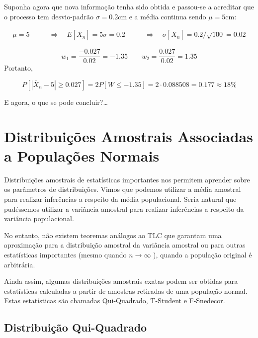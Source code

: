 \documentclass[
]{book}
\theoremstyle{definition}
\theoremstyle{definition}
\theoremstyle{definition}
\theoremstyle{remark}
\begin{document}
Suponha agora que nova informação tenha sido obtida e passou-se a acreditar que o processo tem desvio-padrão \(\sigma = 0.2\)cm e a média continua sendo \(\mu =5\)cm:

\begin{align*}
\mu = 5       & \qquad \Rightarrow \quad E[\bar{X}_n] = 5
\sigma = 0.2  & \qquad \Rightarrow \quad \sigma[\bar{X}_n] = 0.2/\sqrt{100} = 0.02
\end{align*}

\[w_1 = \frac{-0.027}{0.02} =  -1.35 \qquad w_2 = \frac{0.027}{0.02} = 1.35\]
Portanto,

\[P[|\bar{X}_n - 5| \geq 0.027] =  2 P[W \leq -1.35] = 2 \cdot 0.088508 = 0.177 \approx 18\%\]

E agora, o que se pode concluir?\ldots{}

\hypertarget{distribuiuxe7uxf5es-amostrais-associadas-a-populauxe7uxf5es-normais}{%
\section{Distribuições Amostrais Associadas a Populações Normais}\label{distribuiuxe7uxf5es-amostrais-associadas-a-populauxe7uxf5es-normais}}

Distribuições amostrais de estatísticas importantes nos permitem aprender sobre os parâmetros de distribuições. Vimos que podemos utilizar a média amostral para realizar inferências a respeito da média populacional. Seria natural que pudéssemos utilizar a variância amostral para realizar inferências a respeito da variância populacional.

No entanto, não existem teoremas análogos ao TLC que garantam uma aproximação para a distribuição amostral da variância amostral ou para outras estatísticas importantes (mesmo quando \(n \rightarrow \infty\) ), quando a população original é arbitrária.

Ainda assim, algumas distribuições amostrais exatas podem ser obtidas para estatísticas calculadas a partir de amostras retiradas de uma população normal. Estas estatísticas são chamadas Qui-Quadrado, T-Student e F-Snedecor.

\hypertarget{distribuiuxe7uxe3o-qui-quadrado}{%
\subsection*{Distribuição Qui-Quadrado}\label{distribuiuxe7uxe3o-qui-quadrado}}
\end{document}
